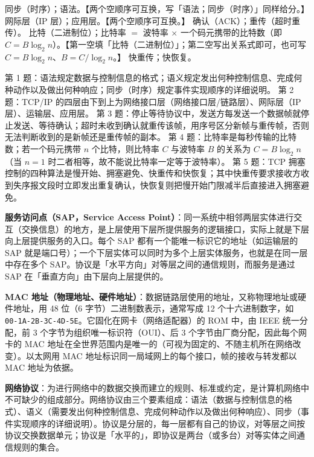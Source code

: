\documentclass[a4paper,11pt]{article}
\begin{document}
\setcounter{question}{0}
\q 同步（时序）；语法。【两个空顺序可互换，写「语法；同步（时序）」同样给分。】\quad
\q 网际层（IP 层）；应用层。【两个空顺序可互换。】\quad
\q 确认（ACK）；重传（超时重传）。\quad
\q 比特（二进制位）；比特率 \(=\) 波特率 \(\times\) 一个码元携带的比特数（即 \(C=B\log_2 n\)）。【第一空填「比特（二进制位）」；第二空写出关系式即可，也可写 \(C=B\log_2 n\)、\(B=C/\log_2 n\)。】\quad
\q 快重传；快恢复。
\begin{analysis}
第 1 题：语法规定数据与控制信息的格式；语义规定发出何种控制信息、完成何种动作以及做出何种响应；同步（时序）规定事件实现顺序的详细说明。
第 2 题：TCP/IP 的四层由下到上为网络接口层（网络接口层/链路层）、网际层（IP 层）、运输层、应用层。
第 3 题：停止等待协议中，发送方每发送一个数据帧就停止发送、等待确认；超时未收到确认就重传该帧，用序号区分新帧与重传帧，否则无法判断收到的是新帧还是重传帧的副本。
第 4 题：比特率是每秒传输的比特数；若一个码元携带 \(n\) 个比特，则比特率 \(C\) 与波特率 \(B\) 的关系为 \(C=B\log_2 n\)（当 \(n=1\) 时二者相等，故不能说比特率一定等于波特率）。
第 5 题：TCP 拥塞控制的四种算法是慢开始、拥塞避免、快重传和快恢复；其中快重传要求接收方收到失序报文段时立即发出重复确认，快恢复则把慢开始门限减半后直接进入拥塞避免。
\end{analysis}

\setcounter{question}{0}
\q \textbf{服务访问点（SAP，Service Access Point）}：同一系统中相邻两层实体进行交互（交换信息）的地方，是上层使用下层所提供服务的逻辑接口，实际上就是下层向上层提供服务的入口。每个 SAP 都有一个能唯一标识它的地址（如运输层的 SAP 就是端口号）；一个下层实体可以同时为多个上层实体服务，也就是在同一层中存在多个 SAP。协议是「水平方向」对等层之间的通信规则，而服务是通过 SAP 在「垂直方向」由下层向上层提供的。

\q \textbf{MAC 地址（物理地址、硬件地址）}：数据链路层使用的地址，又称物理地址或硬件地址，用 48 位（6 字节）二进制数表示，通常写成 12 个十六进制数字，如 \texttt{00-1A-2B-3C-4D-5E}。它固化在网卡（网络适配器）的 ROM 中，由 IEEE 统一分配，前 3 个字节为组织唯一标识符（OUI）、后 3 个字节由厂商分配，因此每个网卡的 MAC 地址在全世界范围内是唯一的（可视为固定的、不随主机所在网络改变）。以太网用 MAC 地址标识同一局域网上的每个接口，帧的接收与转发都以 MAC 地址为依据。

\q \textbf{网络协议}：为进行网络中的数据交换而建立的规则、标准或约定，是计算机网络中不可缺少的组成部分。网络协议由三个要素组成：语法（数据与控制信息的格式）、语义（需要发出何种控制信息、完成何种动作以及做出何种响应）、同步（事件实现顺序的详细说明）。协议是分层的，每一层都有自己的协议，对等层之间按协议交换数据单元；协议是「水平的」，即协议是两台（或多台）对等实体之间通信规则的集合。
\end{document}

